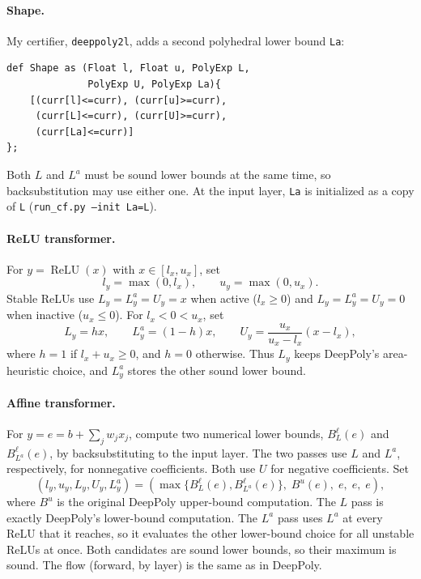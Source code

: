 \paragraph{Shape.}
My certifier, \texttt{deeppoly2l}, adds a second polyhedral
lower bound \texttt{La}:
\begin{verbatim}
def Shape as (Float l, Float u, PolyExp L,
              PolyExp U, PolyExp La){
    [(curr[l]<=curr), (curr[u]>=curr),
     (curr[L]<=curr), (curr[U]>=curr),
     (curr[La]<=curr)]
};
\end{verbatim}
Both $L$ and $L^a$ must be sound lower bounds at the same time, so
backsubstitution may use either one. At the input layer, \texttt{La}
is initialized as a copy of \texttt{L} (\texttt{run\_cf.py --init La=L}).

\paragraph{ReLU transformer.}
For $y=\operatorname{ReLU}(x)$ with $x\in[l_x,u_x]$, set
\[
l_y=\max(0,l_x),\qquad u_y=\max(0,u_x).
\]
Stable ReLUs use $L_y=L_y^a=U_y=x$ when active ($l_x\ge0$) and
$L_y=L_y^a=U_y=0$ when inactive ($u_x\le0$). For $l_x<0<u_x$, set
\[
L_y=hx,\qquad L_y^a=(1-h)x,\qquad
U_y=\frac{u_x}{u_x-l_x}(x-l_x),
\]
where $h=1$ if $l_x+u_x\ge0$, and $h=0$ otherwise.
Thus $L_y$ keeps DeepPoly's area-heuristic choice, and $L_y^a$
stores the other sound lower bound.

\paragraph{Affine transformer.}
For $y=e=b+\sum_j w_jx_j$, compute two numerical lower bounds,
$B_L^\ell(e)$ and $B_{L^a}^\ell(e)$, by backsubstituting to the
input layer. The two passes use $L$ and $L^a$, respectively,
for nonnegative coefficients. Both use $U$ for negative
coefficients. Set
\[
(l_y,u_y,L_y,U_y,L_y^a)
=
\left(
\max\{B_L^\ell(e),B_{L^a}^\ell(e)\},\;
B^u(e),\;e,\;e,\;e
\right),
\]
where $B^u$ is the original DeepPoly upper-bound computation.
The $L$ pass is exactly DeepPoly's lower-bound computation. The
$L^a$ pass uses $L^a$ at every ReLU that it reaches, so it evaluates
the other lower-bound choice for all unstable ReLUs at once.
Both candidates are sound lower bounds, so their maximum is sound.
The flow (forward, by layer) is the same as in DeepPoly.

